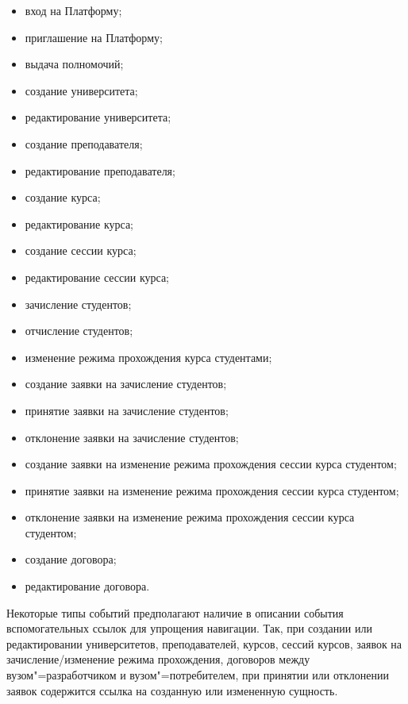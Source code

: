 \begin{itemize}
	\item вход на Платформу;
    \item приглашение на Платформу;
    \item выдача полномочий;
    \item создание университета;
    \item редактирование университета;
    \item создание преподавателя;
    \item редактирование преподавателя;
    \item создание курса;
    \item редактирование курса;
    \item создание сессии курса;
    \item редактирование сессии курса;
    \item зачисление студентов;
    \item отчисление студентов;
    \item изменение режима прохождения курса студентами;
    \item создание заявки на зачисление студентов;
    \item принятие заявки на зачисление студентов;
    \item отклонение заявки на зачисление студентов;
    \item создание заявки на изменение режима прохождения сессии курса студентом;
    \item принятие заявки на изменение режима прохождения сессии курса студентом;
    \item отклонение заявки на изменение режима прохождения сессии курса студентом;
    \item создание договора;
    \item редактирование договора.
\end{itemize}

Некоторые типы событий предполагают наличие в описании события вспомогательных ссылок для упрощения навигации. 
Так, при создании или редактировании университетов, преподавателей, курсов, сессий курсов, 
заявок на зачисление/изменение режима прохождения, договоров между вузом"=разработчиком и вузом"=потребителем,
при принятии или отклонении заявок содержится ссылка на созданную или измененную сущность.


